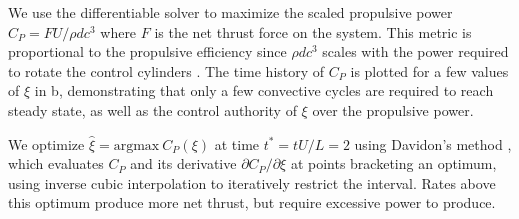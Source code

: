 \documentclass[10pt,a4paper]{article}
\begin{document}
We use the differentiable solver to maximize the scaled propulsive power $C_P = FU/\rho dc^3$ where $F$ is the net thrust force on the system. This metric is  proportional to the propulsive efficiency since $\rho dc^3$ scales with the power required to rotate the control cylinders \citep{schulmeister2017}. The time history of $C_P$ is plotted for a few values of $\xi$ in b, demonstrating that only a few convective cycles are required to reach steady state, as well as the control authority of $\xi$ over the propulsive power.

We optimize $\hat\xi=\text{argmax}\ C_P(\xi)$ at time $t^*=tU/L=2$ using Davidon's method \citep{davidon1991}, which evaluates $C_P$ and its derivative $\partial C_P/\partial \xi$ at points bracketing an optimum, using inverse cubic interpolation to iteratively restrict the interval.  Rates above this optimum produce more net thrust, but require excessive power to produce.
\end{document}
